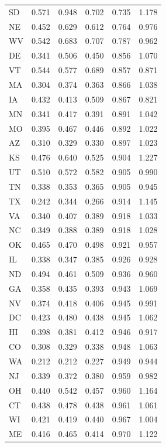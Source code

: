 \begin{longtable}{@{}lrrrrr@{}}
\midrule
\endhead
\bottomrule
\endfoot
SD & 0.571 & 0.948 & 0.702 & 0.735 & 1.178 \\
NE & 0.452 & 0.629 & 0.612 & 0.764 & 0.976 \\
WV & 0.542 & 0.683 & 0.707 & 0.787 & 0.962 \\
DE & 0.341 & 0.506 & 0.450 & 0.856 & 1.070 \\
VT & 0.544 & 0.577 & 0.689 & 0.857 & 0.871 \\
MA & 0.304 & 0.374 & 0.363 & 0.866 & 1.038 \\
IA & 0.432 & 0.413 & 0.509 & 0.867 & 0.821 \\
MN & 0.341 & 0.417 & 0.391 & 0.891 & 1.042 \\
MO & 0.395 & 0.467 & 0.446 & 0.892 & 1.022 \\
AZ & 0.310 & 0.329 & 0.330 & 0.897 & 1.023 \\
KS & 0.476 & 0.640 & 0.525 & 0.904 & 1.227 \\
UT & 0.510 & 0.572 & 0.582 & 0.905 & 0.990 \\
TN & 0.338 & 0.353 & 0.365 & 0.905 & 0.945 \\
TX & 0.242 & 0.344 & 0.266 & 0.914 & 1.145 \\
VA & 0.340 & 0.407 & 0.389 & 0.918 & 1.033 \\
NC & 0.349 & 0.388 & 0.389 & 0.918 & 1.028 \\
OK & 0.465 & 0.470 & 0.498 & 0.921 & 0.957 \\
IL & 0.338 & 0.347 & 0.385 & 0.926 & 0.928 \\
ND & 0.494 & 0.461 & 0.509 & 0.936 & 0.960 \\
GA & 0.358 & 0.435 & 0.393 & 0.943 & 1.069 \\
NV & 0.374 & 0.418 & 0.406 & 0.945 & 0.991 \\
DC & 0.423 & 0.480 & 0.438 & 0.945 & 1.062 \\
HI & 0.398 & 0.381 & 0.412 & 0.946 & 0.917 \\
CO & 0.308 & 0.329 & 0.338 & 0.948 & 1.063 \\
WA & 0.212 & 0.212 & 0.227 & 0.949 & 0.944 \\
NJ & 0.339 & 0.372 & 0.380 & 0.959 & 0.982 \\
OH & 0.440 & 0.542 & 0.457 & 0.960 & 1.164 \\
CT & 0.438 & 0.478 & 0.438 & 0.961 & 1.061 \\
WI & 0.421 & 0.419 & 0.440 & 0.967 & 1.004 \\
ME & 0.416 & 0.465 & 0.414 & 0.970 & 1.122 \\

\end{longtable}
